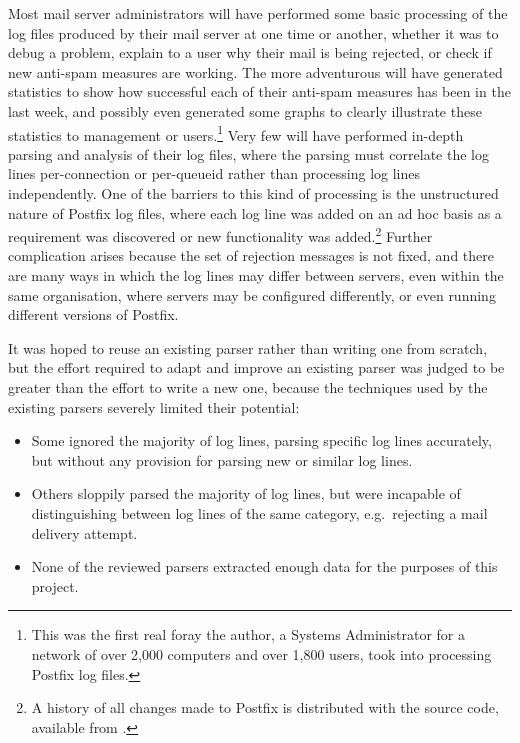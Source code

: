 Most mail server administrators will have performed some basic processing
of the log files produced by their mail server at one time or another,
whether it was to debug a problem, explain to a user why their mail is
being rejected, or check if new anti-spam measures are working.  The more
adventurous will have generated statistics to show how successful each of
their anti-spam measures has been in the last week, and possibly even
generated some graphs to clearly illustrate these statistics to management
or users.\footnote{This was the first real foray the author, a Systems
Administrator for a network of over 2,000 computers and over 1,800 users,
took into processing Postfix log files.}  Very few will have performed
in-depth parsing and analysis of their log files, where the parsing must
correlate the log lines per-connection or per-queueid rather than
processing log lines independently.  One of the barriers to this kind of
processing is the unstructured nature of Postfix log files, where each log
line was added on an ad hoc basis as a requirement was discovered or new
functionality was added.\footnote{A history of all changes made to Postfix
is distributed with the source code, available from
.}  Further
complication arises because the set of rejection messages is not fixed, and
there are many ways in which the log lines may differ between servers, even
within the same organisation, where servers may be configured differently,
or even running different versions of Postfix.

It was hoped to reuse an existing parser rather than writing one from
scratch, but the effort required to adapt and improve an existing parser
was judged to be greater than the effort to write a new one, because the
techniques used by the existing parsers severely limited their potential:

\begin{itemize}

    \item Some ignored the majority of log lines, parsing specific log
        lines accurately, but without any provision for parsing new or
        similar log lines.

    \item Others sloppily parsed the majority of log lines, but were
        incapable of distinguishing between log lines of the same category,
        e.g.\ rejecting a mail delivery attempt.

    \item None of the reviewed parsers extracted enough data for the
        purposes of this project.

\end{itemize}


